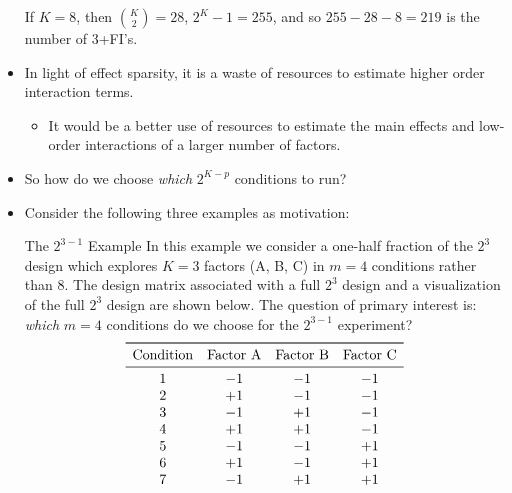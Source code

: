 \begin{itemize}
          \begin{Example}{}{}
              If $ K=8 $, then $ \binom{K}{2}=28 $, $ 2^K-1=255 $, and so $ 255-28-8=219 $ is the number of 3+FI's.
          \end{Example}
    \item In light of effect sparsity, it is a waste of resources to estimate higher order interaction terms.
          \begin{itemize}[*]
              \item It would be a better use of resources to estimate the main effects and low-order interactions of a
                    larger number of factors.
          \end{itemize}
    \item So how do we choose \emph{which} $ 2^{K-p} $ conditions to run?
    \item Consider the following three examples as motivation:
          \begin{Example}{The $ 2^{3-1} $ Example}{}
              In this example we consider a one-half fraction of the $2^3$ design which
              explores $K = 3$ factors (A, B, C) in $m = 4$ conditions rather than $8$. The design matrix associated
              with a full $2^3$ design and a visualization of the full $2^3$ design are shown below. The question of
              primary interest is: \emph{which} $m = 4$ conditions do we choose for the $ 2^{3-1} $ experiment?
              \[ \begin{array}{cccc}
                      \toprule
                      \text{Condition} & \text{Factor A} & \text{Factor B} & \text{Factor C} \\
                      \midrule
                      1                & -1              & -1              & -1              \\
                      2                & +1              & -1              & -1              \\
                      3                & -1              & +1              & -1              \\
                      4                & +1              & +1              & -1              \\
                      5                & -1              & -1              & +1              \\
                      6                & +1              & -1              & +1              \\
                      7                & -1              & +1              & +1              \\

\end{array}\]
\end{Example}
\end{itemize}
